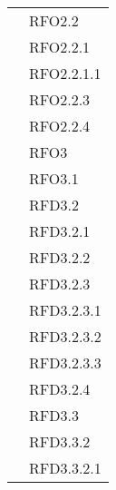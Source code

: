 \begin{longtable}{|>{\centering}m{10cm}|m{3cm}<{\centering}|}
& RFO2.2\\
& RFO2.2.1\\
& RFO2.2.1.1\\
& RFO2.2.3\\
& RFO2.2.4\\
& RFO3\\
& RFO3.1\\
& RFD3.2\\
& RFD3.2.1\\
& RFD3.2.2\\
& RFD3.2.3\\
& RFD3.2.3.1\\
& RFD3.2.3.2\\
& RFD3.2.3.3\\
& RFD3.2.4\\
& RFD3.3\\
& RFD3.3.2\\
& RFD3.3.2.1\\ \hline


\end{longtable}
